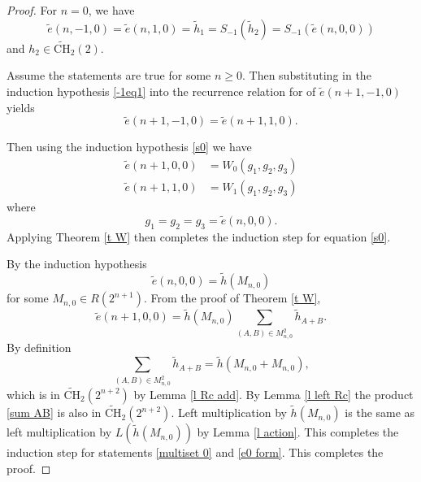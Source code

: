 \documentclass[10pt,a4paper]{amsart}
\newcommand{\tCH}{\tilde{\mathrm{CH}}_2}
\newcommand{\te}{\tilde{e}}
\newcommand{\ti}{\tilde{h}}
\begin{document}
\begin{proof}
 For $n=0$, we have 
 \[
 \te(n,-1,0) = \te(n,1,0)  = \ti_1 = S_{-1}(\ti_2)= S_{-1}( \te(n,0,0)) 
 \]
 and $h_2 \in \tCH(2)$.

Assume the statements are true for some $n \geq 0$. Then substituting in the induction hypothesis \eqref{-1eq1} into the recurrence relation for of $\te(n+1,-1,0)$ yields 
\[
\te(n+1,-1,0) = \te(n+1,1,0). 
\]

Then using the induction hypothesis \eqref{s0} we have
\begin{align*}
\te(n+1,0,0) &=  W_0(g_1,g_2,g_3)\\ 
\te(n+1,1,0) &= W_1(g_1,g_2,g_3)
\end{align*}
where 
\[
g_1 = g_2=g_3 =  \te(n,0,0).
\]
Applying Theorem \ref{t W} then completes the induction step for equation \eqref{s0}. 

By the induction hypothesis
\[
\te(n,0,0) = \ti(M_{n,0})
\]
for some $M_{n,0} \in R(2^{n+1})$.
From the proof of Theorem \ref{t W}, 
 \begin{equation} \label{sum AB}
\te(n+1,0,0) = \ti(M_{n,0}) \sum_{(A,B) \in M_{n,0}^2} \ti_{A+B}.
 \end{equation}
By definition 
 \[
 \sum_{(A,B) \in M_{n,0}^2} \ti_{A+B}=\ti(M_{n,0}+M_{n,0}),
 \]
which is in $\tCH(2^{n+2})$ by Lemma \ref{l Rc add}. By Lemma \ref{l left Rc} the product \eqref{sum AB} is also in $\tCH(2^{n+2})$. Left multiplication by $\ti(M_{n,0})$ is the same as left multiplication by $L(\ti(M_{n,0}) )$ by Lemma \ref{l action}. This completes the induction step for statements \eqref{multiset 0} and \eqref{e0 form}.
This completes the proof. 
\end{proof}
\end{document}
